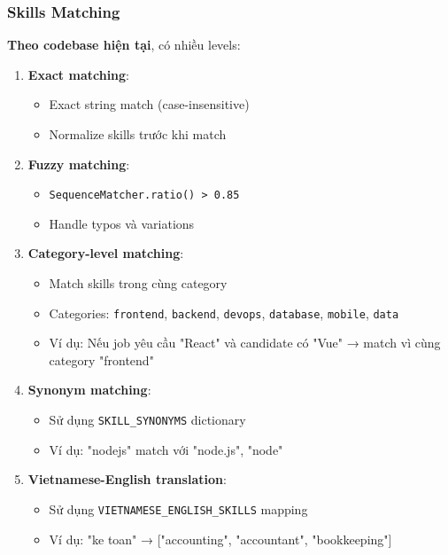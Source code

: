 \subsubsection{Skills Matching}

\textbf{Theo codebase hiện tại}, có nhiều levels:

\begin{enumerate}
    \item \textbf{Exact matching}: 
    \begin{itemize}
        \item Exact string match (case-insensitive)
        \item Normalize skills trước khi match
    \end{itemize}
    
    \item \textbf{Fuzzy matching}:
    \begin{itemize}
        \item \texttt{SequenceMatcher.ratio() > 0.85}
        \item Handle typos và variations
    \end{itemize}
    
    \item \textbf{Category-level matching}:
    \begin{itemize}
        \item Match skills trong cùng category
        \item Categories: \texttt{frontend}, \texttt{backend}, \texttt{devops}, \texttt{database}, \texttt{mobile}, \texttt{data}
        \item Ví dụ: Nếu job yêu cầu "React" và candidate có "Vue" → match vì cùng category "frontend"
    \end{itemize}
    
    \item \textbf{Synonym matching}:
    \begin{itemize}
        \item Sử dụng \texttt{SKILL\_SYNONYMS} dictionary
        \item Ví dụ: "nodejs" match với "node.js", "node"
    \end{itemize}
    
    \item \textbf{Vietnamese-English translation}:
    \begin{itemize}
        \item Sử dụng \texttt{VIETNAMESE\_ENGLISH\_SKILLS} mapping
        \item Ví dụ: "ke toan" → ["accounting", "accountant", "bookkeeping"]
    \end{itemize}
\end{enumerate}


